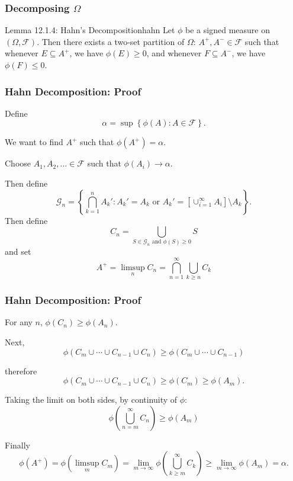 \documentclass[handout]{beamer}
\begin{document}
\frame
{
\frametitle{Decomposing $\Omega$} 


\begin{mytheo}{Lemma 12.1.4: Hahn's Decomposition}{hahn}
Let $\phi$ be a signed measure on $(\Omega, \mathcal{F})$. Then there exists a two-set partition of $\Omega$: $A^+, A^- \in \mathcal{F}$ such that whenever $E \subseteq A^+$, we have $\phi(E) \ge 0$, and whenever $F \subseteq A^-$, we have $\phi(F) \le 0$.
\end{mytheo}

%   
%                                            

}





\frame
{
\frametitle{Hahn Decomposition: Proof} 

Define 
$$
\alpha = \sup \left\{ \phi(A) : A \in \mathcal{F} \right\}.
$$

We want to find $A^+$ such that $\phi(A^+) = \alpha$. 
\newline


Choose $A_1, A_2, \ldots \in \mathcal{F}$ such that $\phi(A_i) \to \alpha$. 

Then define 
$$
\mathcal{G}_n = \left\{ \bigcap_{k=1}^n A_k' : A_k' = A_k \text{ or } A_k' = \left[\cup_{i=1}^\infty A_i\right] \setminus A_k  \right\}.
$$
Then define
$$
C_n = \bigcup_{S \in \mathcal{G}_n \text{ and } \phi(S) \ge 0} S
$$
and set 
$$
A^+ = \limsup_n C_n = \bigcap_{n=1}^{\infty} \bigcup_{k \ge n} C_k
$$

}

\frame
{
\frametitle{Hahn Decomposition: Proof} 

For any $n$, $\phi(C_n) \ge \phi(A_n)$.
\newline

Next, 
$$
\phi\left(C_m \cup \cdots \cup C_{n-1} \cup C_n \right) \ge \phi\left(C_m \cup \cdots \cup C_{n-1} \right)
$$

therefore
$$
\phi\left(C_m \cup \cdots \cup C_{n-1} \cup C_n \right) \ge \phi\left(C_m  \right) \ge  \phi\left(A_m  \right).
$$

Taking the limit on both sides, by continuity of $\phi$:
$$
\phi\left( \bigcup_{n=m}^{\infty} C_n  \right) \ge \phi\left(A_m  \right)
$$


Finally
$$
\phi(A^+) = \phi(\limsup_m C_m) = \lim_{m \to \infty} \phi\left( \bigcup_{k \ge m}^{\infty} C_k  \right) \ge \lim_{m \to \infty} \phi(A_m) = \alpha.
$$


}
\end{document}
